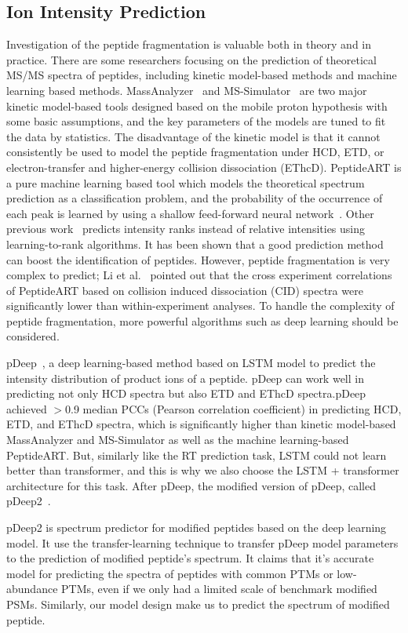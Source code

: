 \subsection{Ion Intensity Prediction}
Investigation of the peptide fragmentation is valuable both in theory and in practice. There are some researchers
focusing on the prediction of theoretical MS/MS spectra of peptides, including kinetic model-based methods and machine
learning based methods. MassAnalyzer~\cite{zhang2004prediction, zhang2005prediction} and MS-Simulator~\cite{sun2012ms,wang2015openms}
are two major kinetic model-based tools designed based on
the mobile proton hypothesis with some basic assumptions, and the key parameters of the models are tuned to ﬁt the data
by statistics. The disadvantage of the kinetic model is that it cannot consistently be used to model the peptide
fragmentation under HCD, ETD, or electron-transfer and higher-energy collision dissociation (EThcD). PeptideART is
 a pure machine learning based tool which models the theoretical spectrum prediction as a classification problem, and
 the probability of the occurrence of each peak is learned by using a shallow feed-forward neural network~\cite{arnold2006machine,li2011accuracy}.
 Other previous work~\cite{frank2009ranking} predicts intensity ranks instead of relative intensities using learning-to-rank algorithms.
 It has been shown that a good prediction method can boost the identification of peptides. However, peptide
 fragmentation is very complex to predict; Li et al.~\cite{li2011accuracy} pointed out that the cross experiment correlations of PeptideART
 based on collision induced dissociation (CID) spectra were significantly lower than within-experiment analyses. To
 handle the complexity of peptide fragmentation, more powerful algorithms such as deep learning should be considered.

pDeep~\cite{zhou2017pdeep}, a deep learning-based method based on LSTM model to predict the intensity distribution of product ions of a peptide. pDeep can
work well in predicting not only HCD spectra but also ETD and EThcD spectra.pDeep achieved  $>$0.9 median PCCs (Pearson correlation coefficient)
in predicting HCD, ETD, and EThcD spectra, which is significantly higher than kinetic model-based MassAnalyzer and MS-Simulator as well
as the machine learning-based PeptideART. But, similarly like the RT prediction task, LSTM could not learn better than transformer, and this is why
we also choose the LSTM + transformer architecture for this task. After pDeep, the modified version of pDeep, called pDeep2~\cite{zeng2019ms}.

pDeep2 is spectrum predictor for modiﬁed peptides based on the deep learning model. It use the transfer-learning technique to transfer pDeep model
parameters to the prediction of modified peptide's spectrum. It claims that it's accurate model for predicting the spectra of peptides with common PTMs or low-abundance PTMs,
even if we only had a limited scale of benchmark modiﬁed PSMs.  Similarly, our model design make us to predict the spectrum of modified peptide.